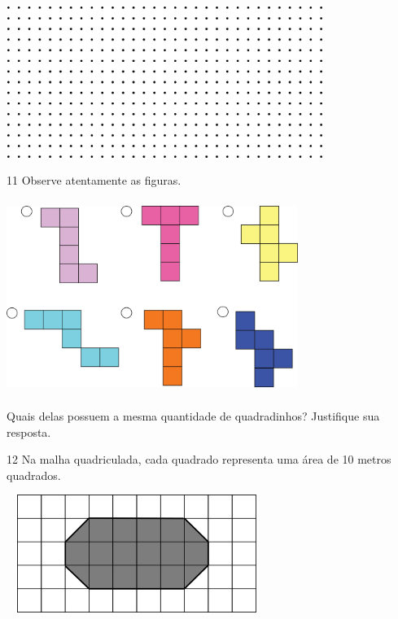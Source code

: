\begin{multicols}{2}

\includegraphics[width=4.05869in,height=1.93350in]{media/image58.png}


\num{11} Observe atentamente as figuras.


\includegraphics[width=3.72532in,height=2.47521in]{media/image59.png}

Quais delas possuem a mesma quantidade de quadradinhos? Justifique sua resposta.


\num{12} Na malha quadriculada, cada quadrado representa uma área de 10 metros quadrados.


\includegraphics[width=3.33333in,height=1.50517in]{media/image60.png}


\end{multicols}
